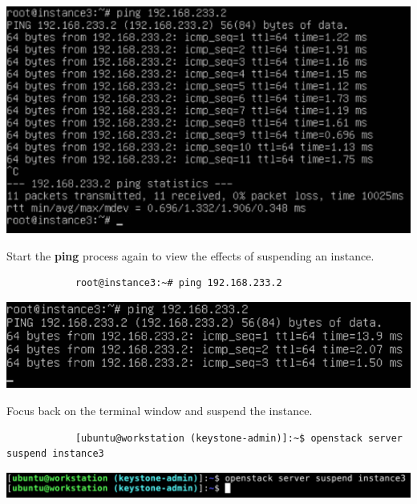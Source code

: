 \documentclass[letterpaper, 12pt]{article}
\begin{document}
\begin{enumerate}
\begin{labstep}
        \begin{center}
            \includegraphics[width=\linewidth]{images/part4/step8.png}
        \end{center}
    \end{labstep}

    \begin{labstep}
        Start the \textbf{ping} process again to view the effects of suspending an instance.
        \begin{lstlisting}
            root@instance3:~# ping 192.168.233.2
        \end{lstlisting}

        \begin{center}
            \includegraphics[width=\linewidth]{images/part4/step9.png}
        \end{center}
    \end{labstep}

    \begin{labstep}
        Focus back on the terminal window and suspend the instance.
        \begin{lstlisting}
            [ubuntu@workstation (keystone-admin)]:~$ openstack server suspend instance3
        \end{lstlisting}

        \begin{center}
            \includegraphics[width=\linewidth]{images/part4/step10.png}
        \end{center}
    \end{labstep}


\end{enumerate}
\end{document}
